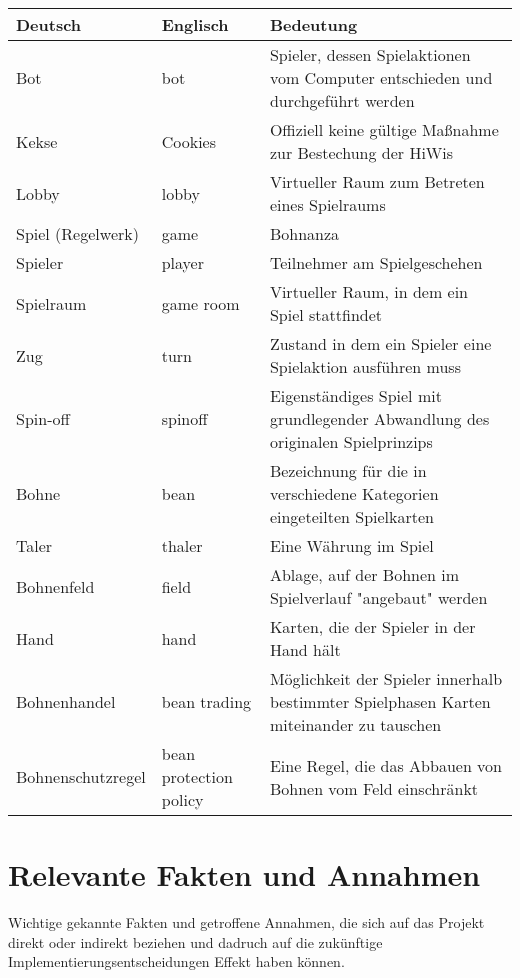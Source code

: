 \begin{center}
		\begin{longtable}{p{} p{} p{}}
			\textbf{Deutsch} & \textbf{Englisch} & \textbf{Bedeutung} \\
			\hline \hline \endhead                   
			Bot & bot & Spieler, dessen Spielaktionen vom Computer entschieden und durchgeführt werden\\
			Kekse & Cookies & Offiziell keine gültige Maßnahme zur Bestechung der HiWis\\          
 			Lobby & lobby & Virtueller Raum zum Betreten eines Spielraums\\	
			Spiel (Regelwerk) & game & Bohnanza \\
			Spieler & player & Teilnehmer am Spielgeschehen\\
			Spielraum & game room & Virtueller Raum, in dem ein Spiel stattfindet\\
			Zug & turn & Zustand in dem ein Spieler eine Spielaktion ausführen muss\\
			Spin-off & spinoff & Eigenständiges Spiel mit grundlegender Abwandlung des originalen Spielprinzips \\
			Bohne & bean & Bezeichnung für die in verschiedene Kategorien eingeteilten Spielkarten\\
			Taler & thaler &  Eine Währung im Spiel\\
			Bohnenfeld & field & Ablage, auf der Bohnen im Spielverlauf "angebaut" werden\\
			Hand & hand & Karten, die der Spieler in der Hand hält\\
			Bohnenhandel & bean trading & Möglichkeit der Spieler innerhalb bestimmter Spielphasen Karten miteinander zu 					tauschen\\
			Bohnenschutzregel & bean protection policy & Eine Regel, die das Abbauen von Bohnen vom Feld einschränkt		
		\end{longtable}
\end{center}

\section{Relevante Fakten und Annahmen}

Wichtige gekannte Fakten und getroffene Annahmen, die sich auf das Projekt direkt oder indirekt beziehen und dadruch auf die zukünftige Implementierungsentscheidungen Effekt haben können.

